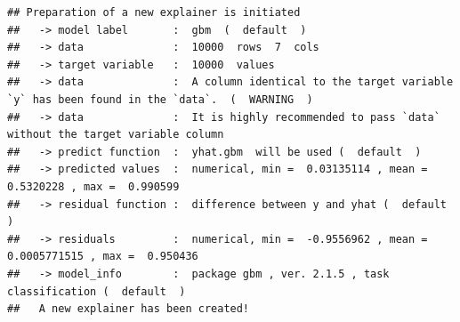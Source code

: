 \documentclass[12pt,]{krantz}
\newenvironment{Shaded}{\begin{snugshade}}{\end{snugshade}}
\newcommand{\ControlFlowTok}[1]{\textcolor[rgb]{0.13,0.29,0.53}{\textbf{#1}}}
\newcommand{\DataTypeTok}[1]{\textcolor[rgb]{0.13,0.29,0.53}{#1}}
\newcommand{\DecValTok}[1]{\textcolor[rgb]{0.00,0.00,0.81}{#1}}
\newcommand{\KeywordTok}[1]{\textcolor[rgb]{0.13,0.29,0.53}{\textbf{#1}}}
\newcommand{\NormalTok}[1]{#1}
\newcommand{\OperatorTok}[1]{\textcolor[rgb]{0.81,0.36,0.00}{\textbf{#1}}}
\newcommand{\OtherTok}[1]{\textcolor[rgb]{0.56,0.35,0.01}{#1}}
\newcommand{\StringTok}[1]{\textcolor[rgb]{0.31,0.60,0.02}{#1}}
\begin{document}
\begin{Shaded}
\end{Shaded}

\begin{verbatim}
## Preparation of a new explainer is initiated
##   -> model label       :  gbm  (  default  )
##   -> data              :  10000  rows  7  cols 
##   -> target variable   :  10000  values 
##   -> data              :  A column identical to the target variable `y` has been found in the `data`.  (  WARNING  )
##   -> data              :  It is highly recommended to pass `data` without the target variable column
##   -> predict function  :  yhat.gbm  will be used (  default  )
##   -> predicted values  :  numerical, min =  0.03135114 , mean =  0.5320228 , max =  0.990599  
##   -> residual function :  difference between y and yhat (  default  )
##   -> residuals         :  numerical, min =  -0.9556962 , mean =  0.0005771515 , max =  0.950436  
##   -> model_info        :  package gbm , ver. 2.1.5 , task classification (  default  ) 
##   A new explainer has been created!
\end{verbatim}

\begin{Shaded}
\end{Shaded}
\end{document}
